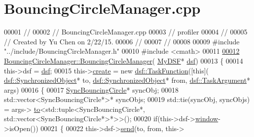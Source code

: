 \hypertarget{_bouncing_circle_manager_8cpp_source}{}\section{Bouncing\+Circle\+Manager.\+cpp}
\label{_bouncing_circle_manager_8cpp_source}

\begin{DoxyCode}
00001 \textcolor{comment}{//}
00002 \textcolor{comment}{//  BouncingCircleManager.cpp}
00003 \textcolor{comment}{//  profiler}
00004 \textcolor{comment}{//}
00005 \textcolor{comment}{//  Created by Yu Chen on 2/22/15.}
00006 \textcolor{comment}{//}
00007 \textcolor{comment}{//}
00008 
00009 \textcolor{preprocessor}{#include "../include/BouncingCircleManager.h"}
00010 \textcolor{preprocessor}{#include <cmath>}
00011 
\hypertarget{_bouncing_circle_manager_8cpp_source_l00012}{}\hyperlink{class_bouncing_circle_manager_a03956961ae6a7c55ffccb15928c58802}{00012} \hyperlink{class_bouncing_circle_manager_a03956961ae6a7c55ffccb15928c58802}{BouncingCircleManager::BouncingCircleManager}(
      \hyperlink{class_my_d_s_f}{MyDSF}* \hyperlink{namespacedsf}{dsf})
00013 \{
00014     this->dsf = \hyperlink{class_bouncing_circle_manager_a4c48cd67fe5ff21396b9e5552d2159a1}{dsf};
00015     this->\hyperlink{class_bouncing_circle_manager_a470d50514892c85df73f25358d202d1b}{create} = \textcolor{keyword}{new} \hyperlink{namespacedsf_aa16e735f29587f4485b56fc46746f7a9}{dsf::TaskFunction}([\textcolor{keyword}{this}](
      \hyperlink{classdsf_1_1_synchronized_object}{dsf::SynchronizedObject}* to, \hyperlink{classdsf_1_1_synchronized_object}{dsf::SynchronizedObject}* from, 
      \hyperlink{classyc_1_1_any}{dsf::TaskArgument}* args)
00016                                          \{
00017                                              \hyperlink{class_sync_bouncing_circle}{SyncBouncingCircle}* syncObj;
00018                                              std::vector<SyncBouncingCircle*>* syncObjs;
00019                                              std::tie(syncObj, syncObjs) = args->
      \hyperlink{classyc_1_1_any_a3db663604505ef8d7e84dd41d5bfcc75}{to}<std::tuple<SyncBouncingCircle*, std::vector<SyncBouncingCircle*>*>>();
00020                                              \textcolor{keywordflow}{if}(this->dsf->\hyperlink{classdsf_1_1sfml_1_1_render_window_a2c04b61ca1bfba140120001c4a9a30e1}{window}->isOpen())
00021                                              \{
00022                                                  this->dsf->\hyperlink{classdsf_1_1_dual_state_framework_a3063d7f0ce537eb44dc2bdcec816a36b}{send}(to, from, this->

\end{DoxyCode}
